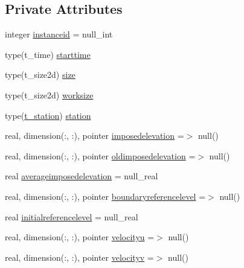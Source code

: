 \subsection*{Private Attributes}
\begin{DoxyCompactItemize}
\item 
integer \mbox{\hyperlink{structmoduleopenboundary_1_1t__openboundary_a879b015d52277905d1b1c3ed02d57812}{instanceid}} = null\+\_\+int
\item 
type(t\+\_\+time) \mbox{\hyperlink{structmoduleopenboundary_1_1t__openboundary_aa144aec6da4169bca31ff5d05010eaff}{starttime}}
\item 
type(t\+\_\+size2d) \mbox{\hyperlink{structmoduleopenboundary_1_1t__openboundary_a9abef6a608d064d8745448f7568574d9}{size}}
\item 
type(t\+\_\+size2d) \mbox{\hyperlink{structmoduleopenboundary_1_1t__openboundary_aaa8bad7a5092a080e772823a3c4e5bb9}{worksize}}
\item 
type(\mbox{\hyperlink{structmoduleopenboundary_1_1t__station}{t\+\_\+station}}) \mbox{\hyperlink{structmoduleopenboundary_1_1t__openboundary_a33c561f91503e4a86bdddc89f365f902}{station}}
\item 
real, dimension(\+:, \+:), pointer \mbox{\hyperlink{structmoduleopenboundary_1_1t__openboundary_aff00d8130b3f31f1ae69312164e4e1cf}{imposedelevation}} =$>$ null()
\item 
real, dimension(\+:, \+:), pointer \mbox{\hyperlink{structmoduleopenboundary_1_1t__openboundary_a321f58fea45109fbe6f935c033e60ba9}{oldimposedelevation}} =$>$ null()
\item 
real \mbox{\hyperlink{structmoduleopenboundary_1_1t__openboundary_a7c21fb434863d322a9670a6bd3344f0e}{averageimposedelevation}} = null\+\_\+real
\item 
real, dimension(\+:, \+:), pointer \mbox{\hyperlink{structmoduleopenboundary_1_1t__openboundary_afac9442d37f63b59c8fd121366843772}{boundaryreferencelevel}} =$>$ null()
\item 
real \mbox{\hyperlink{structmoduleopenboundary_1_1t__openboundary_a93e47989574bda2a3e74682a0c7c83c8}{initialreferencelevel}} = null\+\_\+real
\item 
real, dimension(\+:, \+:), pointer \mbox{\hyperlink{structmoduleopenboundary_1_1t__openboundary_ad1deff01f3ad1c8a40d9fbcb74c93809}{velocityu}} =$>$ null()
\item 
real, dimension(\+:, \+:), pointer \mbox{\hyperlink{structmoduleopenboundary_1_1t__openboundary_af8a0c7d36d3887b4601638ea6dc3ad04}{velocityv}} =$>$ null()

\end{DoxyCompactItemize}
